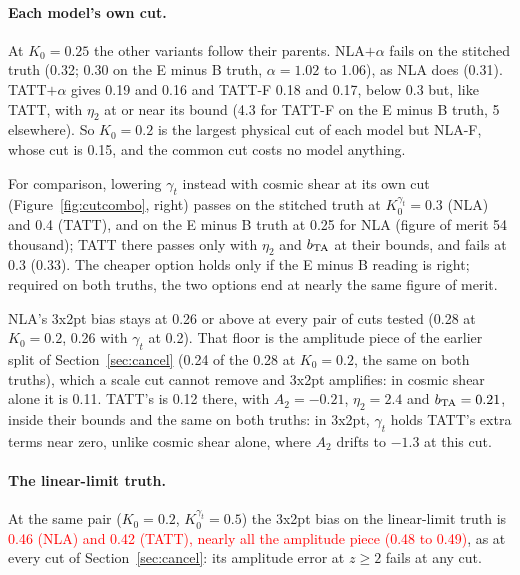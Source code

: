 \documentclass[11pt]{article}
\newif\ifnumbersfinal
\newcommand{\refresh}[1]{\ifnumbersfinal#1\else\textcolor{red}{#1}\fi}
\newcommand{\SCLin}{\refresh{0.46 (NLA) and 0.42 (TATT), nearly all the amplitude piece (0.48 to 0.49)}}
\begin{document}
\paragraph{Each model's own cut.}
At $K_0 = 0.25$ the other variants follow their parents. NLA$+\alpha$ fails on
the stitched truth (0.32; 0.30 on the E minus B truth, $\alpha = 1.02$ to
1.06), as NLA does (0.31). TATT$+\alpha$ gives 0.19 and 0.16 and TATT-F 0.18
and 0.17, below 0.3 but, like TATT, with $\eta_2$ at or near its bound (4.3 for TATT-F on
the E minus B truth, 5 elsewhere). So $K_0 = 0.2$ is the largest physical cut of each
model but NLA-F, whose cut is 0.15, and the common cut costs no model
anything.

For comparison, lowering $\gamma_t$ instead with cosmic shear at its own
cut (Figure~\ref{fig:cutcombo}, right) passes on the stitched truth at
$K_0^{\gamma_t} = 0.3$ (NLA) and 0.4 (TATT), and on the E minus B truth at
0.25 for NLA (figure of merit 54 thousand); TATT there passes only with
$\eta_2$ and $b_{\rm TA}$ at their bounds, and fails at 0.3 (0.33). The
cheaper option holds only if the E minus B reading is right; required on
both truths, the two options end at nearly the same figure of merit.

NLA's 3x2pt bias stays at 0.26 or above at every pair of cuts tested
(0.28 at $K_0 = 0.2$, 0.26 with $\gamma_t$ at 0.2). That floor is the
amplitude piece of the earlier split of Section~\ref{sec:cancel} (0.24 of the 0.28 at $K_0 =
0.2$, the same on both truths), which a scale cut cannot remove and 3x2pt
amplifies: in cosmic shear alone it is 0.11. TATT's is 0.12 there, with
$A_2 = -0.21$, $\eta_2 = 2.4$ and $b_{\rm TA} = 0.21$, inside their
bounds and the same on both truths: in 3x2pt, $\gamma_t$ holds TATT's
extra terms near zero, unlike cosmic shear alone, where $A_2$ drifts to
$-1.3$ at this cut.

\paragraph{The linear-limit truth.}
At the same pair ($K_0 = 0.2$, $K_0^{\gamma_t} = 0.5$) the 3x2pt bias on the
linear-limit truth is \SCLin, as at every cut of Section~\ref{sec:cancel}:
its amplitude error at $z \ge 2$ fails at any cut.
\end{document}
